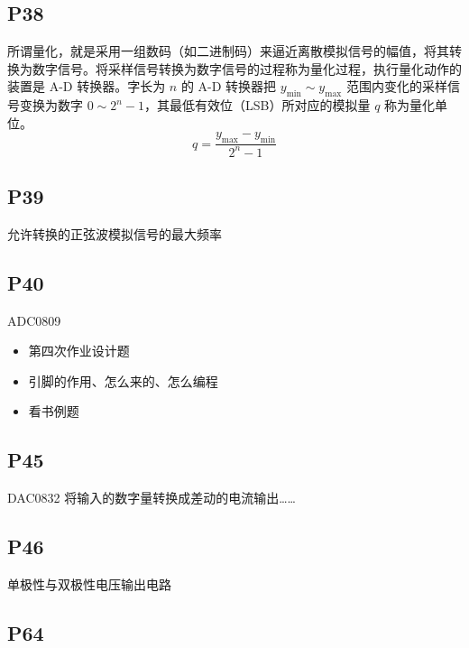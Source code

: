 \documentclass[zihao=-4
]{ctexart}%
\begin{document}
\hypertarget{header-n113}{%
\subsection{P38}\label{header-n113}}

所谓量化，就是采用一组数码（如二进制码）来逼近离散模拟信号的幅值，将其转换为数字信号。将采样信号转换为数字信号的过程称为量化过程，执行量化动作的装置是
A-D 转换器。字长为 \(n\) 的 A-D 转换器把 \(y_{\min}\sim y_{\max}\)
范围内变化的采样信号变换为数字
\(0\sim 2^n - 1\)，其最低有效位（LSB）所对应的模拟量 \(q\)
称为量化单位。
\[q = \frac{y_{\max}- y_{\min}}{2^n-1}\]

\hypertarget{header-n115}{%
\subsection{P39}\label{header-n115}}

允许转换的正弦波模拟信号的最大频率

\hypertarget{header-n117}{%
\subsection{P40}\label{header-n117}}

ADC0809

\begin{itemize}
\item
  第四次作业设计题
\item
  引脚的作用、怎么来的、怎么编程
\item
  看书例题
\end{itemize}

\hypertarget{header-n126}{%
\subsection{P45}\label{header-n126}}

DAC0832 将输入的数字量转换成差动的电流输出\ldots\ldots{}

\hypertarget{header-n128}{%
\subsection{P46}\label{header-n128}}

单极性与双极性电压输出电路

\hypertarget{header-n130}{%
\subsection{P64}\label{header-n130}}
\end{document}
